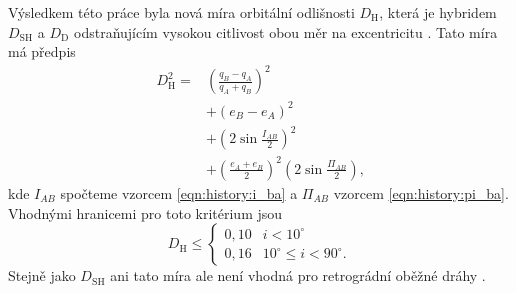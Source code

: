 Výsledkem této práce byla nová míra orbitální odlišnosti $D_\text{H}$, která je hybridem $D_\text{SH}$ a $D_\text{D}$ odstraňujícím vysokou citlivost obou měr na excentricitu \cite{remarks}. Tato míra má předpis \cite{remarks}
\begin{equation}
    \begin{aligned}
        D_\text{H}^2= & \left( \frac{q_B-q_A}{q_A+q_B} \right)^2                                    \\
                      & +\left( e_B-e_A \right)^2                                                   \\
                      & +\left( 2\sin{\frac{I_{AB}}{2}} \right)^2                                   \\
                      & +\left( \frac{e_A+e_B}{2} \right)^2\left( 2\sin{\frac{\Pi_{AB}}{2}} \right) \text{,}
    \end{aligned}
    \label{eqn:revised:d_h}
\end{equation}
kde $I_{AB}$ spočteme vzorcem \eqref{eqn:history:i_ba} a $\Pi_{AB}$ vzorcem \eqref{eqn:history:pi_ba}. Vhodnými hranicemi pro toto kritérium jsou \cite{galligan}
$$
    D_\text{H} \le \begin{cases}
        0{,}10 & i < 10^\circ \\
        0{,}16 & 10^\circ \le i < 90^\circ \text{.}
    \end{cases}
$$
Stejně jako $D_\text{SH}$ ani tato míra ale není vhodná pro retrográdní oběžné dráhy \cite{galligan}.